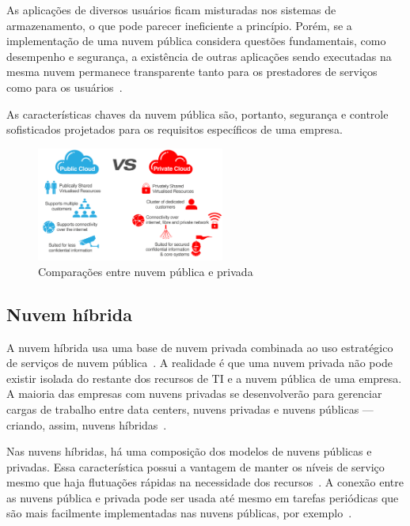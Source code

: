 As aplicações de diversos usuários ficam misturadas nos sistemas de armazenamento,
o que pode parecer ineficiente a princípio. Porém, se a implementação de uma nuvem
pública considera questões fundamentais, como desempenho e segurança, a existência
de outras aplicações sendo executadas na mesma nuvem permanece transparente tanto
para os prestadores de serviços como para os usuários~\cite{technet-cloud-computing}.

As características chaves da nuvem pública são, portanto, segurança e controle
sofisticados projetados para os requisitos específicos de uma empresa.

\begin{figure}[ht]
    \centering
    \includegraphics[width=0.55\textwidth]{img/privatePublic.png}
    \caption{Comparações entre nuvem pública e
        privada~\cite{code-trick-getting-started-cloud}
    }
\end{figure}

\subsection{Nuvem híbrida}

A nuvem híbrida usa uma base de nuvem privada combinada ao uso estratégico de 
serviços de nuvem pública~\cite{ibm-what-is-cloud-computing}. A realidade é que uma 
nuvem privada não pode existir isolada do restante dos recursos de TI e a nuvem 
pública de uma empresa. A maioria das empresas com nuvens privadas se desenvolverão 
para gerenciar cargas de trabalho entre data centers, nuvens privadas e nuvens 
públicas --- criando, assim, nuvens híbridas~\cite{ibm-what-is-cloud-computing}.

Nas nuvens híbridas, há uma composição dos modelos de nuvens públicas e privadas.
Essa característica possui a vantagem de manter os níveis de serviço mesmo que
haja flutuações rápidas na necessidade dos recursos~\cite{technet-cloud-computing}.
A conexão entre as nuvens pública e privada pode ser usada até mesmo em tarefas
periódicas que são mais facilmente implementadas nas nuvens públicas, por
exemplo~\cite{technet-cloud-computing}.

